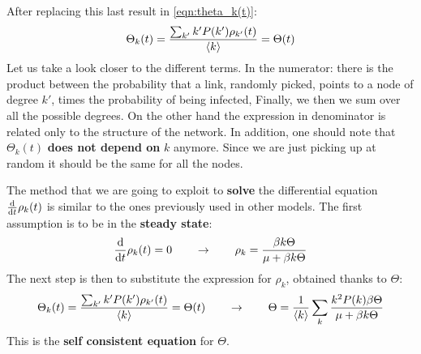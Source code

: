 \documentclass[../main/main.tex]{subfiles}
\begin{document}
After replacing this last result in \ref{eqn:theta_k(t)}:
\begin{equation*}
  \Theta _k (t) = \frac{\sum_{k'}k' P(k') \rho _{k'} (t)  }{\expval{k} } = \Theta (t)
\end{equation*}
Let us take a look closer to the different terms. In the numerator: there is the product between the probability that a link, randomly picked, points to a node of degree \( k' \), times the probability of being infected, Finally, we then we sum over all the possible degrees. On the other hand the expression in denominator is related only to the structure of the network. In addition, one should note that \( \Theta _k (t) \) \textbf{does not depend on} \( k \) anymore. Since we are just picking up at random it should be the same for all the nodes.

The method that we are going to exploit to \textbf{solve} the differential equation \( \dv{}{t} \rho _k (t) \) is similar to the ones previously used in other models. The first assumption is to be in the \textbf{steady state}:
\begin{equation*}
  \dv{}{t} \rho _k (t) = 0 \qquad \rightarrow  \qquad \rho _k = \frac{\beta k \Theta }{\mu + \beta k \Theta }
\end{equation*}
The next step is then to substitute the expression for \( \rho _k  \), obtained thanks to \( \Theta  \):
\begin{equation*}
    \Theta _k (t) = \frac{\sum_{k'}^{} k' P(k') \rho _{k'} (t)  }{\expval{k} } = \Theta (t) \qquad \rightarrow \qquad \Theta = \frac{1}{\expval{k} } \sum_{k}^{} \frac{k^2 P(k) \beta \Theta }{\mu + \beta k \Theta }
\end{equation*}
This is the \textbf{self consistent equation} for \( \Theta  \).
\end{document}
